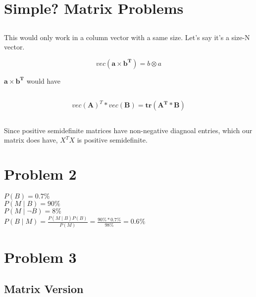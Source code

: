 \documentclass{article}
\newcommand{\matr}[1]{\mathbf{#1}}
\begin{document}
\section{Simple? Matrix Problems}
	\subsection{} %
	This would only work in a column vector with a same size. Let's say it's a size-N vector.

	\begin{equation*}
	vec(\matr{a} \times \matr{b^{T}}) = b \otimes a
	\end{equation*}

	$ \matr{a} \times \matr{b^{T}}$ would have 

	\subsection{} %

	\begin{equation*}
	vec(\matr{A})^{T} * vec(\matr{B}) = \matr{tr(\matr{A^{T}}*\matr{B})} 
	\end{equation*}	

	\subsection{} %
	Since positive semidefinite matrices have non-negative diagnoal entries, which our matrix does have, $X^{T}X$ 
	is positive semidefinite.

\section {Problem 2}
	$P(B) = 0.7\%$\\
	$P(M \mid B) = 90\%$\\
	$P(M \mid \neg B) = 8\%$\\
	$P(B \mid M)  = \frac{P(M \mid B) P(B)}{P(M)} = \frac{90\% * 0.7\%}{98\%} = \mathbf{0.6\%}$

\section {Problem 3}
	\subsection{Matrix Version} %
		\subsubsection{} %
\end{document}
